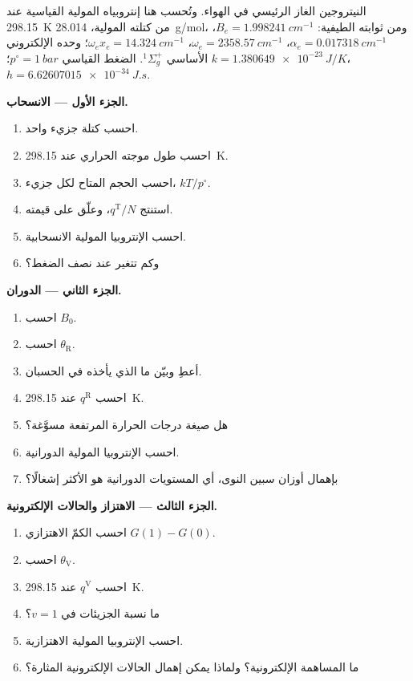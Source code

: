 \begin{problem}
\label{pb:b3:partition-functions:1}
النيتروجين الغاز الرئيسي في الهواء. وتُحسب هنا إنتروبياه المولية القياسية عند
\qty{298.15}{K} من كتلته المولية، \qty{28.014}{g/mol}، ومن
ثوابته الطيفية: $B_e = \qty{1.998241}{cm^{-1}}$، $\alpha_e = \qty{0.017318}{cm^{-1}}$، $\omega_e =
\qty{2358.57}{cm^{-1}}$، $\omega_ex_e = \qty{14.324}{cm^{-1}}$؛ وحده الإلكتروني الأساسي ${}^1\Sigma_g^+$.
الضغط القياسي $p^\circ = \qty{1}{bar}$؛ $k = \qty{1.380649e-23}{J/K}$، $h = \qty{6.62607015e-34}{J.s}$.

\medskip\noindent\textbf{الجزء الأول --- الانسحاب.}
\begin{enumerate}
  \item احسب كتلة جزيء واحد.
  \item احسب طول موجته الحراري عند \qty{298.15}{K}.
  \item احسب الحجم المتاح لكل جزيء، $kT/p^\circ$.
  \item استنتج $q^{\mathrm T}/N$، وعلّق على قيمته.
  \item احسب الإنتروبيا المولية الانسحابية.
  \item وكم تتغير عند نصف الضغط؟
\end{enumerate}

\medskip\noindent\textbf{الجزء الثاني --- الدوران.}
\begin{enumerate}[resume]
  \item احسب $B_0$.
  \item احسب $\theta_{\mathrm R}$.
  \item أعطِ  وبيّن ما الذي يأخذه في الحسبان.
  \item احسب $q^{\mathrm R}$ عند \qty{298.15}{K}.
  \item هل صيغة درجات الحرارة المرتفعة مسوَّغة؟
  \item احسب الإنتروبيا المولية الدورانية.
  \item بإهمال أوزان سبين النوى، أي المستويات الدورانية هو الأكثر
        إشغالًا؟
\end{enumerate}

\medskip\noindent\textbf{الجزء الثالث --- الاهتزاز والحالات الإلكترونية.}
\begin{enumerate}[resume]
  \item احسب الكمّ الاهتزازي $G(1) - G(0)$.
  \item احسب $\theta_{\mathrm V}$.
  \item احسب $q^{\mathrm V}$ عند \qty{298.15}{K}.
  \item ما نسبة الجزيئات في $v = 1$؟
  \item احسب الإنتروبيا المولية الاهتزازية.
  \item ما المساهمة الإلكترونية؟ ولماذا يمكن إهمال الحالات الإلكترونية
        المثارة؟
\end{enumerate}


\end{problem}
